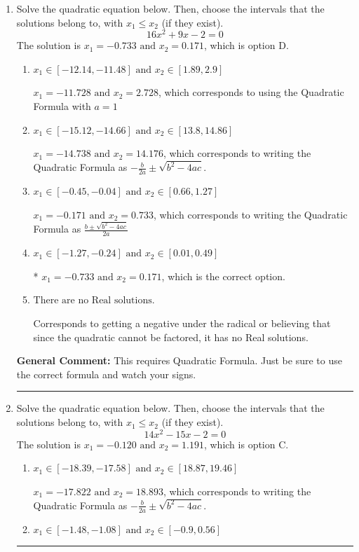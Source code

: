 \documentclass{extbook}[14pt]
\newcommand{\litem}[1]{\item #1

\rule{\textwidth}{0.4pt}}
\begin{document}
\begin{enumerate}\litem{
Solve the quadratic equation below. Then, choose the intervals that the solutions belong to, with $x_1 \leq x_2$ (if they exist).
\[ 16x^{2} +9 x -2 = 0 \]The solution is \( x_1 = -0.733 \text{ and } x_2 = 0.171 \), which is option D.\begin{enumerate}[label=\Alph*.]
\item \( x_1 \in [-12.14, -11.48] \text{ and } x_2 \in [1.89, 2.9] \)

 $x_1 = -11.728 \text{ and } x_2 = 2.728$, which corresponds to using the Quadratic Formula with $a=1$
\item \( x_1 \in [-15.12, -14.66] \text{ and } x_2 \in [13.8, 14.86] \)

 $x_1 = -14.738 \text{ and } x_2 = 14.176$, which corresponds to writing the Quadratic Formula as $-\frac{b}{2a} \pm \sqrt{b^2 - 4ac}$.
\item \( x_1 \in [-0.45, -0.04] \text{ and } x_2 \in [0.66, 1.27] \)

 $x_1 = -0.171 \text{ and } x_2 = 0.733$, which corresponds to writing the Quadratic Formula as $\frac{b \pm \sqrt{b^2 - 4ac}}{2a}$
\item \( x_1 \in [-1.27, -0.24] \text{ and } x_2 \in [0.01, 0.49] \)

* $x_1 = -0.733 \text{ and } x_2 = 0.171$, which is the correct option.
\item \( \text{There are no Real solutions.} \)

Corresponds to getting a negative under the radical or believing that since the quadratic cannot be factored, it has no Real solutions.
\end{enumerate}

\textbf{General Comment:} This requires Quadratic Formula. Just be sure to use the correct formula and watch your signs.
}
\litem{
Solve the quadratic equation below. Then, choose the intervals that the solutions belong to, with $x_1 \leq x_2$ (if they exist).
\[ 14x^{2} -15 x -2 = 0 \]The solution is \( x_1 = -0.120 \text{ and } x_2 = 1.191 \), which is option C.\begin{enumerate}[label=\Alph*.]
\item \( x_1 \in [-18.39, -17.58] \text{ and } x_2 \in [18.87, 19.46] \)

 $x_1 = -17.822 \text{ and } x_2 = 18.893$, which corresponds to writing the Quadratic Formula as $-\frac{b}{2a} \pm \sqrt{b^2 - 4ac}$.
\item \( x_1 \in [-1.48, -1.08] \text{ and } x_2 \in [-0.9, 0.56] \)


\end{enumerate}}
\end{enumerate}
\end{document}
